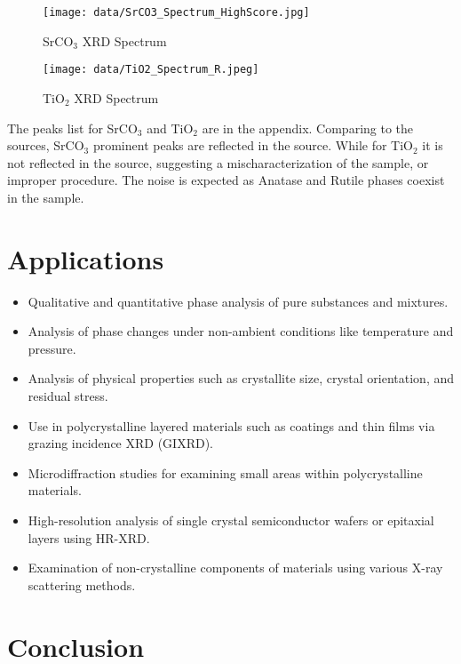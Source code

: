 \documentclass[11pt]{article}
\begin{document}
\clearpage
	
	\begin{figure}[!ht]
		\centering
		\texttt{[image: data/SrCO3\_Spectrum\_HighScore.jpg]}
		\caption{SrCO$_3$ XRD Spectrum}
	\end{figure}
	
	\begin{figure}[!ht]
		\centering
		\texttt{[image: data/TiO2\_Spectrum\_R.jpeg]}
		\caption{TiO$_2$ XRD Spectrum}
	\end{figure}
	
	The peaks list for SrCO$_3$ and TiO$_2$ are in the appendix. Comparing to the sources, SrCO$_3$ prominent peaks are reflected in the source. While for TiO$_2$ it is not reflected in the source, suggesting a mischaracterization of the sample, or improper procedure. The noise is expected as Anatase and Rutile phases coexist in the sample.
	
\clearpage
	
	\section{Applications}
	
	\begin{itemize}
		\item Qualitative and quantitative phase analysis of pure substances and mixtures.
		\item Analysis of phase changes under non-ambient conditions like temperature and pressure.
		\item Analysis of physical properties such as crystallite size, crystal orientation, and residual stress.
		\item Use in polycrystalline layered materials such as coatings and thin films via grazing incidence XRD (GIXRD).
		\item Microdiffraction studies for examining small areas within polycrystalline materials.
		\item High-resolution analysis of single crystal semiconductor wafers or epitaxial layers using HR-XRD.
		\item Examination of non-crystalline components of materials using various X-ray scattering methods.
	\end{itemize}
	
\clearpage
	
	\section{Conclusion}
	
\end{document}
